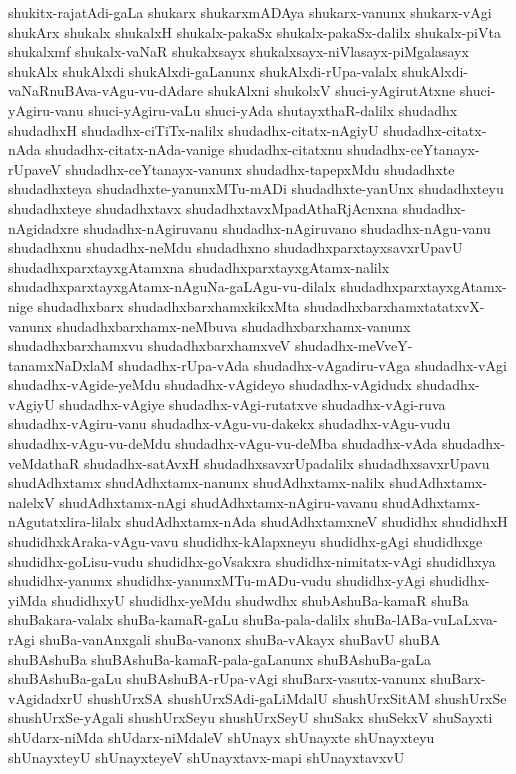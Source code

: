 {shukitx-rajatAdi-gaLa
shukarx
shukarxmADAya
shukarx-vanunx
shukarx-vAgi
shukArx
shukalx
shukalxH
shukalx-pakaSx
shukalx-pakaSx-dalilx
shukalx-piVta
shukalxmf
shukalx-vaNaR
shukalxsayx
shukalxsayx-niVlasayx-piMgalasayx
shukAlx
shukAlxdi
shukAlxdi-gaLanunx
shukAlxdi-rUpa-valalx
shukAlxdi-vaNaRnuBAva-vAgu-vu-dAdare
shukAlxni
shukolxV
shuci-yAgirutAtxne
shuci-yAgiru-vanu
shuci-yAgiru-vaLu
shuci-yAda
shutayxthaR-dalilx
shudadhx
shudadhxH
shudadhx-ciTiTx-nalilx
shudadhx-citatx-nAgiyU
shudadhx-citatx-nAda
shudadhx-citatx-nAda-vanige
shudadhx-citatxnu
shudadhx-ceYtanayx-rUpaveV
shudadhx-ceYtanayx-vanunx
shudadhx-tapepxMdu
shudadhxte
shudadhxteya
shudadhxte-yanunxMTu-mADi
shudadhxte-yanUnx
shudadhxteyu
shudadhxteye
shudadhxtavx
shudadhxtavxMpadAthaRjAcnxna
shudadhx-nAgidadxre
shudadhx-nAgiruvanu
shudadhx-nAgiruvano
shudadhx-nAgu-vanu
shudadhxnu
shudadhx-neMdu
shudadhxno
shudadhxparxtayxsavxrUpavU
shudadhxparxtayxgAtamxna
shudadhxparxtayxgAtamx-nalilx
shudadhxparxtayxgAtamx-nAguNa-gaLAgu-vu-dilalx
shudadhxparxtayxgAtamx-nige
shudadhxbarx
shudadhxbarxhamxkikxMta
shudadhxbarxhamxtatatxvX-vanunx
shudadhxbarxhamx-neMbuva
shudadhxbarxhamx-vanunx
shudadhxbarxhamxvu
shudadhxbarxhamxveV
shudadhx-meVveY-tanamxNaDxlaM
shudadhx-rUpa-vAda
shudadhx-vAgadiru-vAga
shudadhx-vAgi
shudadhx-vAgide-yeMdu
shudadhx-vAgideyo
shudadhx-vAgidudx
shudadhx-vAgiyU
shudadhx-vAgiye
shudadhx-vAgi-rutatxve
shudadhx-vAgi-ruva
shudadhx-vAgiru-vanu
shudadhx-vAgu-vu-dakekx
shudadhx-vAgu-vudu
shudadhx-vAgu-vu-deMdu
shudadhx-vAgu-vu-deMba
shudadhx-vAda
shudadhx-veMdathaR
shudadhx-satAvxH
shudadhxsavxrUpadalilx
shudadhxsavxrUpavu
shudAdhxtamx
shudAdhxtamx-nanunx
shudAdhxtamx-nalilx
shudAdhxtamx-nalelxV
shudAdhxtamx-nAgi
shudAdhxtamx-nAgiru-vavanu
shudAdhxtamx-nAgutatxlira-lilalx
shudAdhxtamx-nAda
shudAdhxtamxneV
shudidhx
shudidhxH
shudidhxkAraka-vAgu-vavu
shudidhx-kAlapxneyu
shudidhx-gAgi
shudidhxge
shudidhx-goLisu-vudu
shudidhx-goVsakxra
shudidhx-nimitatx-vAgi
shudidhxya
shudidhx-yanunx
shudidhx-yanunxMTu-mADu-vudu
shudidhx-yAgi
shudidhx-yiMda
shudidhxyU
shudidhx-yeMdu
shudwdhx
shubAshuBa-kamaR
shuBa
shuBakara-valalx
shuBa-kamaR-gaLu
shuBa-pala-dalilx
shuBa-lABa-vuLaLxva-rAgi
shuBa-vanAnxgali
shuBa-vanonx
shuBa-vAkayx
shuBavU
shuBA
shuBAshuBa
shuBAshuBa-kamaR-pala-gaLanunx
shuBAshuBa-gaLa
shuBAshuBa-gaLu
shuBAshuBA-rUpa-vAgi
shuBarx-vasutx-vanunx
shuBarx-vAgidadxrU
shushUrxSA
shushUrxSAdi-gaLiMdalU
shushUrxSitAM
shushUrxSe
shushUrxSe-yAgali
shushUrxSeyu
shushUrxSeyU
shuSakx
shuSekxV
shuSayxti
shUdarx-niMda
shUdarx-niMdaleV
shUnayx
shUnayxte
shUnayxteyu
shUnayxteyU
shUnayxteyeV
shUnayxtavx-mapi
shUnayxtavxvU
}
